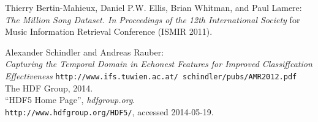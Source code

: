 
\begin{thebibliography}{10}

Thierry Bertin-Mahieux, Daniel P.W. Ellis, Brian Whitman, and Paul Lamere:\\
\emph{The Million Song Dataset. In Proceedings of the 12th International Society}
for Music Information Retrieval Conference (ISMIR 2011).

Alexander Schindler and Andreas Rauber: \\
\emph{Capturing the Temporal Domain in Echonest Features for Improved Classiffcation Effectiveness}
\texttt{http://www.ifs.tuwien.ac.at/~schindler/pubs/AMR2012.pdf}
The HDF Group,
2014.\\
``HDF5 Home Page'',
\emph{hdfgroup.org}.\\
\verb+http://www.hdfgroup.org/HDF5/+, accessed 2014-05-19.

\end{thebibliography}